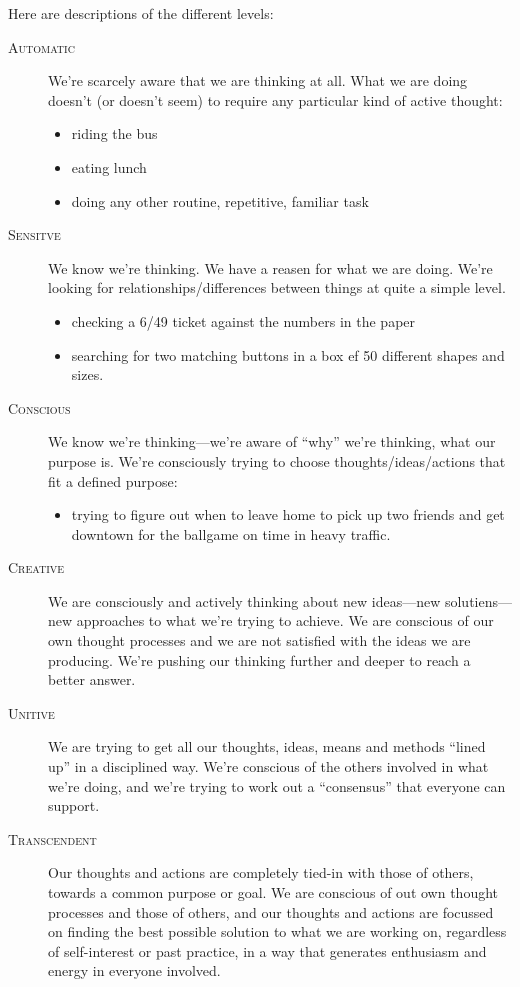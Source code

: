 \documentclass[a5paper]{article}
\begin{document}
Here are descriptions of the different levels:
\begin{description}
 \item[\scshape Automatic] We're scarcely aware that we are thinking at all.
    What we are doing doesn't (or doesn't seem) to require any particular kind of active thought:
    \begin{itemize}
      \item riding the bus
      \item eating lunch
      \item doing any other routine, repetitive, familiar task
    \end{itemize}
  \item[\scshape Sensitve] We know we're thinking.
    We have a reasen for what we are doing.
    We're looking for relationships/differences between things at quite a simple level.
    \begin{itemize}
      \item checking a 6/49 ticket against the numbers in the paper
      \item searching for two matching buttons in a box ef 50 different shapes and sizes.
    \end{itemize}
  \item[\scshape Conscious] We know we're thinking---we're aware of ``why'' we're thinking, what our purpose is.
    We're consciously trying to choose thoughts/ideas/actions that fit a defined purpose:
    \begin{itemize}
      \item trying to figure out when to leave home to pick up two friends and get downtown for the ballgame on time in heavy traffic.
    \end{itemize}
  \item[\scshape Creative] We are consciously and actively thinking about new ideas---new solutiens---new approaches to what we're trying to achieve.
    We are conscious of our own thought processes and we are not satisfied with the ideas we are producing.
    We're pushing our thinking further and deeper to reach a better answer.
  \item[\scshape Unitive] We are trying to get all our thoughts, ideas, means and methods ``lined up'' in a disciplined way.
    We're conscious of the others involved in what we're doing, and we're trying to work out a ``consensus'' that everyone can support.
  \item[\scshape Transcendent] Our thoughts and actions are completely tied-in with those of others, towards a common purpose or goal.
    We are conscious of out own thought processes and those of others, and our thoughts and actions are focussed on finding the best possible solution to what we are working on, regardless of self-interest or past practice, in a way that generates enthusiasm and energy in everyone involved.
\end{description}
\end{document}
